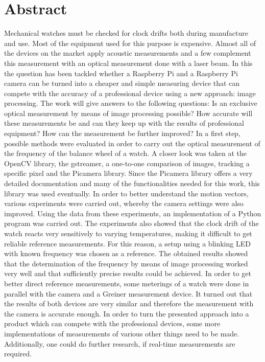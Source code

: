 \documentclass[12pt, a4paper]{report}
\begin{document}
\chapter*{Abstract}
Mechanical watches must be checked for clock drifts both during manufacture and use. Most of the equipment used for this purpose is expensive. Almost all of the devices on the market apply acoustic measurements and a few complement this measurement with an optical measurement done with a laser beam. In this the question has been tackled whether a Raspberry Pi and a Raspberry Pi camera can be turned into a cheaper and simple measuring device that can compete with the accuracy of a professional device using a new approach: image processing. 
\newline
The work will give answers to the following questions: Is an exclusive optical measurement by means of image processing possible? How accurate will these measurements be and can they keep up with the results of professional equipment? How can the measurement be further improved? 
\newline
In a first step, possible methods were evaluated in order to carry out the optical measurement of the frequency of the balance wheel of a watch. A closer look was taken at the OpenCV library, the gstreamer, a one-to-one comparison of images, tracking a specific pixel and the Picamera library. Since the Picamera library offers a very detailed documentation and many of the functionalities needed for this work, this library was used eventually. In order to better understand the motion vectors, various experiments were carried out, whereby the camera settings were also improved. Using the data from these experiments, an implementation of a Python program was carried out. The experiments also showed that the clock drift of the watch reacts very sensitively to varying temperatures, making it difficult to get reliable reference measurements. For this reason, a setup using a blinking LED with known frequency was chosen as a reference. The obtained results showed that the determination of the frequency by means of image processing worked very well and that sufficiently precise results could be achieved. In order to get better direct reference measurements, some meterings of a watch were done in parallel with the camera and a Greiner measurement device. It turned out that the results of both devices are very similar and therefore the measurement with the camera is accurate enough. In order to turn the presented approach into a product which can compete with the professional devices, some more implementations of measurements of various other things need to be made. Additionally, one could do further research, if real-time measurements are required.
\end{document}
